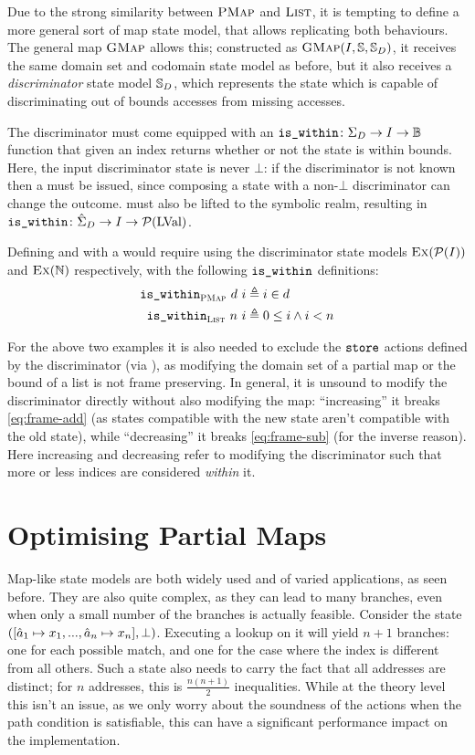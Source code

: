 Due to the strong similarity between $\textsc{PMap}$ and $\textsc{List}$, it is tempting to define a more general sort of map state model, that allows replicating both behaviours. The general map $\textsc{GMap}$ allows this; constructed as $\textsc{GMap}(I,\mathbb S,\mathbb S_D)$, it receives the same domain set and codomain state model as before, but it also receives a \emph{discriminator} state model $\mathbb S_D$, which represents the state which is capable of discriminating out of bounds accesses from missing accesses.

The discriminator must come equipped with an $\texttt{is\_within}\colon \Sigma_D \rightarrow I \rightarrow \mathbb{B}$ function that given an index returns whether or not the state is within bounds. Here, the input discriminator state is never $\bot$: if the discriminator is not known then a \Miss{} must be issued, since composing a state with a non-$\bot$ discriminator can change the outcome.  must also be lifted to the symbolic realm, resulting in $\texttt{is\_within}\colon \hat{\Sigma}_D\rightarrow I\rightarrow {\cal P}(\text{LVal})$.

Defining \PMap{} and \List{} with a \GMap{} would require using the discriminator state models $\textsc{Ex}({\cal P}(I))$ and $\textsc{Ex}(\mathbb N)$ respectively, with the following $\texttt{is\_within}$ definitions: \begin{align*}
	\texttt{is\_within}_{\textsc{PMap}}~d~i&\triangleq i\in d\\
	\texttt{is\_within}_{\textsc{List}}~n~i&\triangleq 0 \leq i \land i < n
\end{align*}

For the above two examples it is also needed to exclude the $\texttt{store}$ actions defined by the discriminator (via \Ex), as modifying the domain set of a partial map or the bound of a list is not frame preserving. In general, it is unsound to modify the discriminator directly without also modifying the map: ``increasing'' it breaks \ref{eq:frame-add} (as states compatible with the new state aren't compatible with the old state), while ``decreasing'' it breaks \ref{eq:frame-sub} (for the inverse reason). Here increasing and decreasing refer to modifying the discriminator such that more or less indices are considered \emph{within} it.

\section{Optimising Partial Maps} \label{sec:theory-optim-pmap}

Map-like state models are both widely used and of varied applications, as seen before. They are also quite complex, as they can lead to many branches, even when only a small number of the branches is actually feasible. Consider the \PMap{} state $([ \hat{a}_1\mapsto x_1, ..., \hat{a}_n\mapsto x_n ], \bot)$. Executing a lookup on it will yield $n+1$ branches: one for each possible match, and one for the case where the index is different from all others. Such a state also needs to carry the fact that all addresses are distinct; for $n$ addresses, this is $\frac{n(n+1)}{2}$ inequalities. While at the theory level this isn't an issue, as we only worry about the soundness of the actions when the path condition is satisfiable, this can have a significant performance impact on the implementation.

